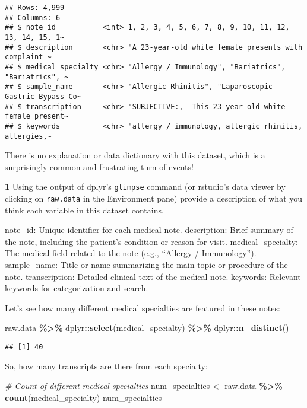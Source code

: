 \documentclass[
]{article}
\newenvironment{Shaded}{\begin{snugshade}}{\end{snugshade}}
\newcommand{\CommentTok}[1]{\textcolor[rgb]{0.56,0.35,0.01}{\textit{#1}}}
\newcommand{\FunctionTok}[1]{\textcolor[rgb]{0.13,0.29,0.53}{\textbf{#1}}}
\newcommand{\NormalTok}[1]{#1}
\newcommand{\OtherTok}[1]{\textcolor[rgb]{0.56,0.35,0.01}{#1}}
\newcommand{\SpecialCharTok}[1]{\textcolor[rgb]{0.81,0.36,0.00}{\textbf{#1}}}
\begin{document}
\begin{verbatim}
## Rows: 4,999
## Columns: 6
## $ note_id           <int> 1, 2, 3, 4, 5, 6, 7, 8, 9, 10, 11, 12, 13, 14, 15, 1~
## $ description       <chr> "A 23-year-old white female presents with complaint ~
## $ medical_specialty <chr> "Allergy / Immunology", "Bariatrics", "Bariatrics", ~
## $ sample_name       <chr> "Allergic Rhinitis", "Laparoscopic Gastric Bypass Co~
## $ transcription     <chr> "SUBJECTIVE:,  This 23-year-old white female present~
## $ keywords          <chr> "allergy / immunology, allergic rhinitis, allergies,~
\end{verbatim}

There is no explanation or data dictionary with this dataset, which is a
surprisingly common and frustrating turn of events!

\textbf{1} Using the output of dplyr's \texttt{glimpse} command (or
rstudio's data viewer by clicking on \texttt{raw.data} in the
Environment pane) provide a description of what you think each variable
in this dataset contains.

note\_id: Unique identifier for each medical note. description: Brief
summary of the note, including the patient's condition or reason for
visit. medical\_specialty: The medical field related to the note (e.g.,
``Allergy / Immunology''). sample\_name: Title or name summarizing the
main topic or procedure of the note. transcription: Detailed clinical
text of the medical note. keywords: Relevant keywords for categorization
and search.

Let's see how many different medical specialties are featured in these
notes:

\begin{Shaded}
\begin{Highlighting}[]
\NormalTok{raw.data }\SpecialCharTok{\%\textgreater{}\%}\NormalTok{ dplyr}\SpecialCharTok{::}\FunctionTok{select}\NormalTok{(medical\_specialty) }\SpecialCharTok{\%\textgreater{}\%}\NormalTok{ dplyr}\SpecialCharTok{::}\FunctionTok{n\_distinct}\NormalTok{()}
\end{Highlighting}
\end{Shaded}

\begin{verbatim}
## [1] 40
\end{verbatim}

So, how many transcripts are there from each specialty:

\begin{Shaded}
\begin{Highlighting}[]
\CommentTok{\# Count of different medical specialties}
\NormalTok{num\_specialties }\OtherTok{\textless{}{-}}\NormalTok{ raw.data }\SpecialCharTok{\%\textgreater{}\%} \FunctionTok{count}\NormalTok{(medical\_specialty)}
\NormalTok{num\_specialties}
\end{Highlighting}
\end{Shaded}
\end{document}
